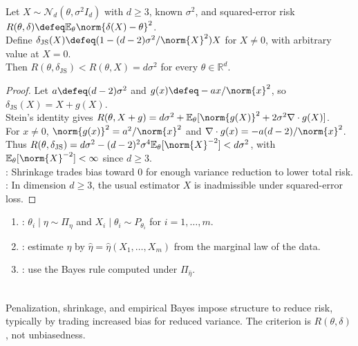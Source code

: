 \begin{theorem} \label{thm:james-stein-phenomenon} \\
Let $X\sim\mathcal{N}_d(\theta,\sigma^2I_d)$ with $d\geq3$, known $\sigma^2$, and squared-error risk $R(\theta,\delta)\defeq\mathbb{E}_\theta\norm{\delta(X)-\theta}^2$.\\
Define $\delta_{\mathrm{JS}}(X)\defeq(1-(d-2)\sigma^2/\norm{X}^2)X$ for $X\neq0$, with arbitrary value at $X=0$.\\
Then $R(\theta,\delta_{\mathrm{JS}})<R(\theta,X)=d\sigma^2$ for every $\theta\in\mathbb{R}^d$.
\begin{proof} Let $a\defeq(d-2)\sigma^2$ and $g(x)\defeq-ax/\norm{x}^2$, so $\delta_{\mathrm{JS}}(X)=X+g(X)$.\\
Stein's identity gives $R(\theta,X+g)=d\sigma^2+\mathbb{E}_\theta[\norm{g(X)}^2+2\sigma^2\nabla\cdot g(X)]$.\\
For $x\neq0$, $\norm{g(x)}^2=a^2/\norm{x}^2$ and $\nabla\cdot g(x)=-a(d-2)/\norm{x}^2$.\\
Thus $R(\theta,\delta_{\mathrm{JS}})=d\sigma^2-(d-2)^2\sigma^4\mathbb{E}_\theta[\norm{X}^{-2}]<d\sigma^2$, with $\mathbb{E}_\theta[\norm{X}^{-2}]<\infty$ since $d\geq3$.\\
: Shrinkage trades bias toward $0$ for enough variance reduction to lower total risk.\\
: In dimension $d\geq3$, the usual estimator $X$ is inadmissible under squared-error loss.
\end{proof}
\end{theorem}

\begin{definition} \label{def:empirical-bayes-rule} 
\begin{enumerate}[label=(\roman*)]
\setlength{\itemsep}{0pt}
\item {}: $\theta_i\mid\eta\sim\Pi_\eta$ and $X_i\mid\theta_i\sim P_{\theta_i}$ for $i=1,\ldots,m$.
\item {}: estimate $\eta$ by $\widehat{\eta}=\widehat{\eta}(X_1,\ldots,X_m)$ from the marginal law of the data.
\item {}: use the Bayes rule computed under $\Pi_{\widehat{\eta}}$.
\end{enumerate}
\end{definition}

\begin{remark} \label{rem:regularization-decision-theory} \\
Penalization, shrinkage, and empirical Bayes impose structure to reduce risk, typically by trading increased bias for reduced variance. The criterion is $R(\theta,\delta)$, not unbiasedness.
\end{remark}
